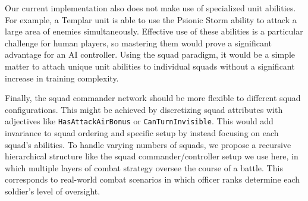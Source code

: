 \documentclass[10pt,a4paper,twocolumn]{article}
\begin{document}
Our current implementation also does not make use of specialized unit abilities. For example, a Templar unit is able to use the Psionic Storm ability to attack a large area of enemies simultaneously. Effective use of these abilities is a particular challenge for human players, so mastering them would prove a significant advantage for an AI controller. Using the squad paradigm, it would be a simple matter to attach unique unit abilities to individual squads without a significant increase in training complexity.

Finally, the squad commander network should be more flexible to different squad configurations. This might be achieved by discretizing squad attributes with adjectives like \texttt{HasAttackAirBonus} or \texttt{CanTurnInvisible}. This would add invariance to squad ordering and specific setup by instead focusing on each squad's abilities. To handle varying numbers of squads, we propose a recursive hierarchical structure like the squad commander/controller setup we use here, in which multiple layers of combat strategy oversee the course of a battle. This corresponds to real-world combat scenarios in which officer ranks determine each soldier's level of oversight.
	


\end{document}

